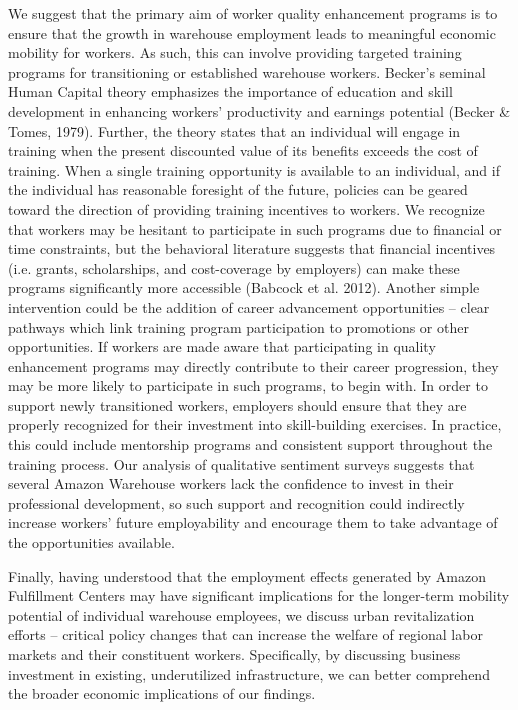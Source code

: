 \documentclass[11pt]{article}
\begin{document}
\begin{text}
\-\hspace{0.5cm} We suggest that the primary aim of worker quality enhancement programs is to ensure that the growth in warehouse employment leads to meaningful economic mobility for workers.  As such, this can involve providing targeted training programs for transitioning or established warehouse workers. Becker's seminal Human Capital theory emphasizes the importance of education and skill development in enhancing workers' productivity and earnings potential (Becker \& Tomes, 1979). Further, the theory states that an individual will engage in training when the present discounted value of its benefits exceeds the cost of training. When a single training opportunity is available to an individual, and if the individual has reasonable foresight of the future, policies can be geared toward the direction of providing training incentives to workers. We recognize that workers may be hesitant to participate in such programs due to financial or time constraints, but the behavioral literature suggests that financial incentives (i.e. grants, scholarships, and cost-coverage by employers) can make these programs significantly more accessible (Babcock et al. 2012). Another simple intervention could be the addition of career advancement opportunities -- clear pathways which link training program participation to promotions or other opportunities. If workers are made aware that participating in quality enhancement programs may directly contribute to their career progression, they may be more likely to participate in such programs, to begin with. In order to support newly transitioned workers, employers should ensure that they are properly recognized for their investment into skill-building exercises. In practice, this could include mentorship programs and consistent support throughout the training process. Our analysis of qualitative sentiment surveys suggests that several Amazon Warehouse workers lack the confidence to invest in their professional development, so such support and recognition could indirectly increase workers' future employability and encourage them to take advantage of the opportunities available. 

\-\hspace{0.5cm} Finally, having understood that the employment effects generated by Amazon Fulfillment Centers may have significant implications for the longer-term mobility potential of individual warehouse employees, we discuss urban revitalization efforts -- critical policy changes that can increase the welfare of regional labor markets and their constituent workers. Specifically, by discussing business investment in existing, underutilized infrastructure, we can better comprehend the broader economic implications of our findings.


\end{text}
\end{document}
